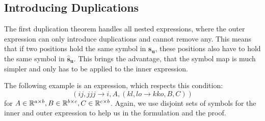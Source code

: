 \subsection{Introducing Duplications}

The first duplication theorem handles all nested expressions, where the outer expression can only introduce duplications and cannot remove any.
This means that if two positions hold the same symbol in $\bm{s_u}$, these positions also have to hold the same symbol in $\bm{\hat{s}_u}$.
This brings the advantage, that the symbol map is much simpler and only has to be applied to the inner expression.

The following example is an expression, which respects this condition:
$$(ij, jjj \rightarrow i, A, (kl, lo \rightarrow kko, B, C))$$
for $A \in \mathbb{R}^{a \times b}, B \in \mathbb{R}^{b \times c}, C \in \mathbb{R}^{c \times b}$.
Again, we use disjoint sets of symbols for the inner and outer expression to help us in the formulation and the proof.

